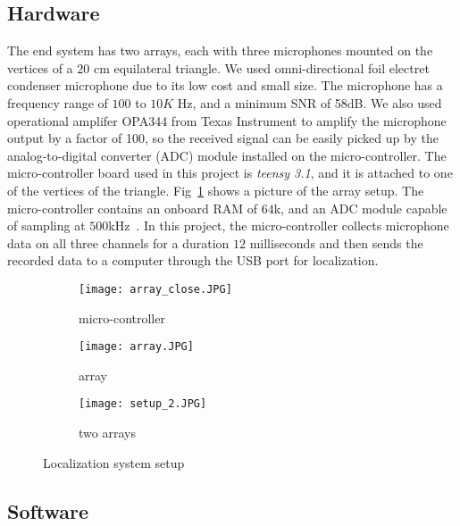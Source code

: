 \subsection{Hardware}
The end system has two arrays, each with three microphones mounted on the vertices of a $20$ cm equilateral triangle. We used omni-directional foil electret condenser microphone due to its low cost and small size. The microphone has a frequency range of $100$ to $10K$ Hz, and a minimum SNR of 58dB\cite{sys:1}. We also used operational amplifer OPA344 from Texas Instrument to amplify the microphone output by a factor of 100, so the received signal can be easily picked up by the analog-to-digital converter (ADC) module installed on the micro-controller. The micro-controller board used in this project is \emph{teensy 3.1}, and it is attached to one of the vertices of the triangle. Fig~\ref{fig:setup_array} shows a picture of the array setup.  The micro-controller contains an onboard RAM of $64$k, and an ADC module capable of sampling at $500$kHz~\cite{tdoa:micloc, sys:teensy}. In this project, the micro-controller collects microphone data on all three channels for a duration $12$ milliseconds and then sends the recorded data to a computer through the USB port for localization. 

\begin{figure}[h!]
  \centering
  \begin{subfigure}[]{.48\textwidth}
    \texttt{[image: array\_close.JPG]}
    \caption{micro-controller}
  \end{subfigure}
  \begin{subfigure}[]{.48\textwidth}
    \texttt{[image: array.JPG]}
    \caption{array}
  \end{subfigure}
  \begin{subfigure}[]{.48\textwidth}
    \texttt{[image: setup\_2.JPG]}
    \caption{two arrays}
  \end{subfigure}
  \caption{Localization system setup}
  \label{fig:setup_array}
\end{figure}

\subsection{Software}


